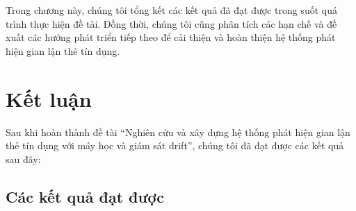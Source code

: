 Trong chương này, chúng tôi tổng kết các kết quả đã đạt được trong suốt quá trình thực hiện đề tài. Đồng thời, chúng tôi cũng phân tích các hạn chế và đề xuất các hướng phát triển tiếp theo để cải thiện và hoàn thiện hệ thống phát hiện gian lận thẻ tín dụng.

\section{Kết luận}

Sau khi hoàn thành đề tài ``Nghiên cứu và xây dựng hệ thống phát hiện gian lận thẻ tín dụng với máy học và giám sát drift'', chúng tôi đã đạt được các kết quả sau đây:

\subsection{Các kết quả đạt được}

